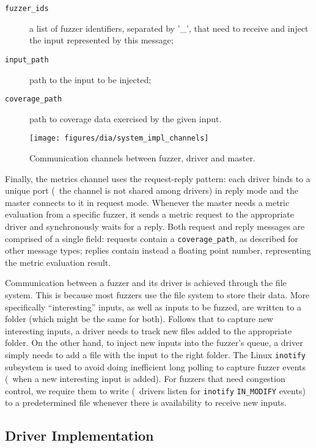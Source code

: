 \begin{description}
    \item[\texttt{fuzzer\_ids}] a list of fuzzer identifiers, separated by '\_',
        that need to receive and inject the input represented by this message;
    \item[\texttt{input\_path}] path to the input to be injected;
    \item[\texttt{coverage\_path}] path to coverage data exercised by the given
        input.
\end{description}

\begin{figure}[t]
    \centering
    \texttt{[image: figures/dia/system\_impl\_channels]}
    \caption{Communication channels between fuzzer, driver and master.}
    \label{fig:system-impl}
\end{figure}

Finally, the metrics channel uses the request-reply pattern: each driver binds
to a unique port (\ie~the channel is not shared among drivers) in reply mode and
the master connects to it in request mode. Whenever the master needs a metric
evaluation from a specific fuzzer, it sends a metric request to the appropriate
driver and synchronously waits for a reply. Both request and reply messages are
comprised of a single field: requests contain a \texttt{coverage\_path}, as
described for other message types; replies contain instead a floating point
number, representing the metric evaluation result.

Communication between a fuzzer and its driver is achieved through the file
system. This is because most fuzzers use the file system to store their data.
More specifically ``interesting'' inputs, as well as inputs to be fuzzed, are
written to a folder (which might be the same for both). Follows that to capture
new interesting inputs, a driver needs to track new files added to the
appropriate folder. On the other hand, to inject new inputs into the fuzzer's
queue, a driver simply needs to add a file with the input to the right folder.
The Linux \texttt{inotify} subsystem is used to avoid doing inefficient long
polling to capture fuzzer events (\eg~when a new interesting input is added).
For fuzzers that need congestion control, we require them to write (\ie~drivers
listen for \texttt{inotify} \texttt{IN\_MODIFY} events) to a predetermined file
whenever there is availability to receive new inputs.

\subsection{Driver Implementation}
\label{sec:driver-impl}

